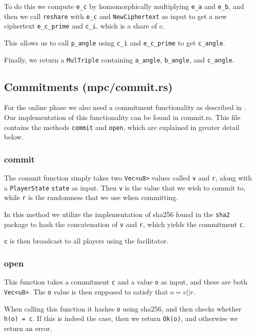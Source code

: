 \documentclass[../main.tex]{subfiles}
\begin{document}
To do this we compute \lstinline{e_c} by homomorphically multiplying \lstinline{e_a} and \lstinline{e_b}, and then we call \lstinline{reshare} with \lstinline{e_c} and \lstinline{NewCiphertext} as input to get a new ciphertext \lstinline{e_c_prime} and \lstinline{c_i}, which is a share of c. 

This allows us to call \lstinline{p_angle} using \lstinline{c_i} and \lstinline{e_c_prime} to get \lstinline{c_angle}.

Finally, we return a \lstinline{MulTriple} containing \lstinline{a_angle}, \lstinline{b_angle}, and \lstinline{c_angle}.

\subsection{Commitments (mpc/commit.rs)}
For the online phase we also need a commitment functionality as described in \cite{damgaard2013practical}.
Our implementation of this functionality can be found in commit.rs. This file contains the methods \lstinline{commit} and \lstinline{open}, which are explained in greater detail below.

\subsubsection{commit}
The commit function simply takes two \lstinline{Vec<u8>} values called \lstinline{v} and \lstinline{r}, along with a \lstinline{PlayerState} \lstinline{state} as input. Then \lstinline{v} is the value that we wish to commit to, while \lstinline{r} is the randomness that we use when committing.

In this method we utilize the implementation of sha256 found in the \lstinline{sha2} package to hash the concatenation of \lstinline{v} and \lstinline{r}, which yields the commitment \lstinline{c}.

\lstinline{c} is then broadcast to all players using the facilitator.

\subsubsection{open}
This function takes a commitment \lstinline{c} and a value \lstinline{o} as input, and these are both \lstinline{Vec<u8>}. The \lstinline{o} value is then supposed to satisfy that $o = v || r$.

When calling this function it hashes \lstinline{o} using sha256, and then checks whether \lstinline{h(o) = c}. If this is indeed the case, then we return \lstinline{Ok(o)}, and otherwise we return an error.
\end{document}
